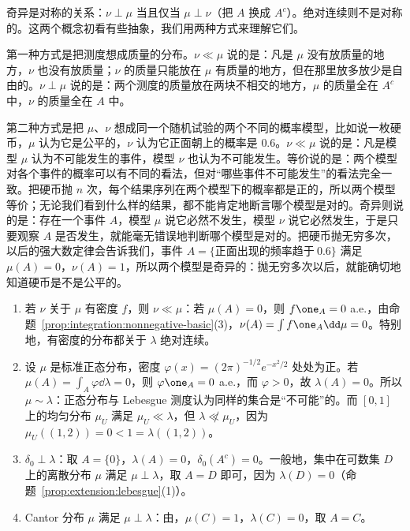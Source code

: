 奇异是对称的关系：$\nu\perp\mu$ 当且仅当 $\mu\perp\nu$（把 $A$ 换成 $A^c$）。绝对连续则不是对称的。这两个概念初看有些抽象，我们用两种方式来理解它们。

第一种方式是把测度想成质量的分布。$\nu\ll\mu$ 说的是：凡是 $\mu$ 没有放质量的地方，$\nu$ 也没有放质量；$\nu$ 的质量只能放在 $\mu$ 有质量的地方，但在那里放多放少是自由的。$\nu\perp\mu$ 说的是：两个测度的质量放在两块不相交的地方，$\mu$ 的质量全在 $A^c$ 中，$\nu$ 的质量全在 $A$ 中。

第二种方式是把 $\mu$、$\nu$ 想成同一个随机试验的两个不同的概率模型，比如说一枚硬币，$\mu$ 认为它是公平的，$\nu$ 认为它正面朝上的概率是 $0.6$。$\nu\ll\mu$ 说的是：凡是模型 $\mu$ 认为不可能发生的事件，模型 $\nu$ 也认为不可能发生。等价说的是：两个模型对各个事件的概率可以有不同的看法，但对“哪些事件不可能发生”的看法完全一致。把硬币抛 $n$ 次，每个结果序列在两个模型下的概率都是正的，所以两个模型等价；无论我们看到什么样的结果，都不能肯定地断言哪个模型是对的。奇异则说的是：存在一个事件 $A$，模型 $\mu$ 说它必然不发生，模型 $\nu$ 说它必然发生，于是只要观察 $A$ 是否发生，就能毫无错误地判断哪个模型是对的。把硬币抛无穷多次，以后的强大数定律会告诉我们，事件 $A=\{\text{正面出现的频率趋于}\ 0.6\}$ 满足 $\mu(A)=0$，$\nu(A)=1$，所以两个模型是奇异的：抛无穷多次以后，就能确切地知道硬币是不是公平的。

\begin{example}\label{ex:ac:examples}
\begin{enumerate}
\item 若 $\nu$ 关于 $\mu$ 有密度 $f$，则 $\nu\ll\mu$：若 $\mu(A)=0$，则 $f\one_A=0$ a.e.，由命题~\ref{prop:integration:nonnegative-basic}(3)，$\nu(A)=\int f\one_A\dd\mu=0$。特别地，有密度的分布都关于 $\lambda$ 绝对连续。
\item 设 $\mu$ 是标准正态分布，密度 $\varphi(x)=(2\pi)^{-1/2}e^{-x^2/2}$ 处处为正。若 $\mu(A)=\int_A\varphi\dd\lambda=0$，则 $\varphi\one_A=0$ a.e.，而 $\varphi>0$，故 $\lambda(A)=0$。所以 $\mu\sim\lambda$：正态分布与 Lebesgue 测度认为同样的集合是“不可能”的。而 $[0,1]$ 上的均匀分布 $\mu_U$ 满足 $\mu_U\ll\lambda$，但 $\lambda\not\ll\mu_U$，因为 $\mu_U((1,2))=0<1=\lambda((1,2))$。
\item $\delta_0\perp\lambda$：取 $A=\{0\}$，$\lambda(A)=0$，$\delta_0(A^c)=0$。一般地，集中在可数集 $D$ 上的离散分布 $\mu$ 满足 $\mu\perp\lambda$，取 $A=D$ 即可，因为 $\lambda(D)=0$（命题~\ref{prop:extension:lebesgue}(1)）。
\item Cantor 分布 $\mu$ 满足 $\mu\perp\lambda$：由，$\mu(C)=1$，$\lambda(C)=0$，取 $A=C$。
\end{enumerate}
\end{example}

